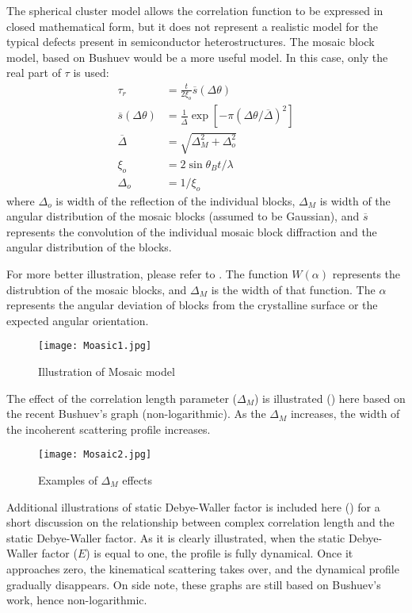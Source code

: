 The spherical cluster model allows the correlation function to be expressed in closed mathematical form, but it does not represent a realistic model for the typical defects present in semiconductor heterostructures.  The mosaic block model, based on Bushuev \cite{Bushuev2} would be a more useful model.  In this case, only the real part of $\tau$ is used:
\begin{align}
\tau_r &= \frac{t}{2 \xi_o} \overline{s}(\Delta \theta) \label{mosaic1} \\
\overline{s}(\Delta \theta) &= \frac{1}{\overline{\Delta}} \exp \left[ -\pi (\Delta \theta /\overline{\Delta})^2 \right] \label{mosaic2}\\
\overline{\Delta} &= \sqrt{\Delta_M^2 + \Delta_o^2}\label{mosaic3}\\
\xi_o &= 2 \sin \theta_B t /\lambda\label{mosaic4}\\
\Delta_o &= 1/\xi_o \label{mosaic5}
\end{align}
where $\Delta_o$ is width of the reflection of the individual blocks, $\Delta_M$ is width of the angular distribution of the mosaic blocks (assumed to be Gaussian), and $\overline{s}$ represents the convolution of the individual mosaic block diffraction and the angular distribution of the blocks.

For more better illustration, please refer to .  The function $W(\alpha)$  represents the distrubtion of the mosaic blocks, and $\Delta_M$ is the width of that function.  The $\alpha$ represents the angular deviation of blocks from the crystalline surface or the expected angular orientation.
\begin{figure}[h]
\centering
\caption{Illustration of Mosaic model}
\label{Mosaic1}
\texttt{[image: Moasic1.jpg]}
\end{figure}

The effect of the correlation length parameter ($\Delta_M$) is illustrated  () here based on the recent Bushuev's graph (non-logarithmic).  As the $\Delta_M$ increases, the width of the incoherent scattering profile increases.
\begin{figure}[h]
\centering
\caption{Examples of $\Delta_M$ effects}
\label{Mosaic2}
\texttt{[image: Mosaic2.jpg]}
\end{figure}

Additional illustrations of static Debye-Waller factor is included here () for a short discussion on the relationship between complex correlation length and the static Debye-Waller factor.  As it is clearly illustrated, when the static Debye-Waller factor ($E$) is equal to one, the profile is fully dynamical.  Once it approaches zero, the kinematical scattering takes over, and the dynamical profile gradually disappears.  On side note, these graphs are still based on Bushuev's work, hence non-logarithmic.

